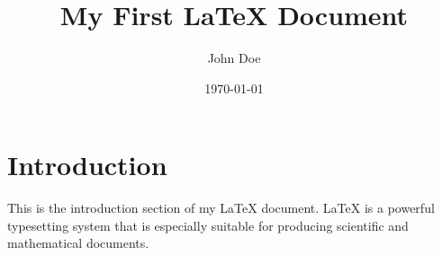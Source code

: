 \documentclass{article}
\title{My First LaTeX Document}
\author{John Doe}
\date{\today}
\begin{document}
\maketitle

\section{Introduction}
This is the introduction section of my LaTeX document. LaTeX is a powerful typesetting system that is especially suitable for producing scientific and mathematical documents.
\end{document}
